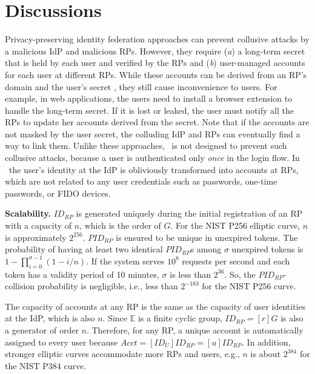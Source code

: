 \section{Discussions}
\label{sec:discussion}

Privacy-preserving identity federation approaches \cite{ELPASSO, UnlimitID, idemix, PseudoID, Opaak, uprov} can prevent collusive attacks by a malicious IdP and malicious RPs.
However, they require (\emph{a}) a long-term secret that is held by each user and verified by the RPs and (\emph{b}) user-managed accounts for each user at different RPs.
While these accounts can be derived from an RP's domain and the user's secret \cite{ELPASSO, UnlimitID, Opaak, uprov,idemix},
 they still cause inconvenience to users.
For example, in web applications, the users need to install a browser extension to handle the long-term secret.
If it is lost or leaked, the user must notify all the RPs to update her accounts derived from the secret.
Note that if the accounts are not masked by the user secret,
 the colluding IdP and RPs can eventually find a way to link them.
Unlike these approaches, \usso\ is not designed to prevent such collusive attacks,
 because a user is authenticated only \emph{once} in the login flow.
In \usso\ the user's identity at the IdP is obliviously transformed into accounts at RPs,
 which are not related to any user credentials such as passwords, one-time passwords, %
  or FIDO devices.

\noindent \textbf{Scalability.}
$ID_{RP}$ is generated uniquely during the initial registration of an RP with a capacity of $n$, which is the order of $G$. For the NIST P256 elliptic curve, $n$ is approximately $2^{256}$.
$PID_{RP}$ is ensured to be unique in unexpired tokens.
The probability of having at least two identical $PID_{RP}$s among $\sigma$ unexpired tokens is $1-\prod_{i=0}^{\sigma-1}(1-i/n)$.
If the system serves $10^{8}$ requests per second and each token has a validity period of 10 minutes, $\sigma$ is less than $2^{36}$. So, the $PID_{RP}$-collision probability is negligible, i.e., less than $2^{-183}$ for the NIST P256 curve.

The capacity of accounts at any RP is the same as the capacity of user identities at the IdP,
 which is also $n$.
Since $\mathbb{E}$ is a finite cyclic group, $ID_{RP} = [r]G$ is also a generator of order $n$.
Therefore, for any RP, a unique account is automatically assigned to every user because $Acct =  [ID_U]ID_{RP} = [u]ID_{RP}$.
In addition, stronger elliptic curves accommodate more RPs and users, e.g., $n$ is about $2^{384}$ for the NIST P384 curve.



